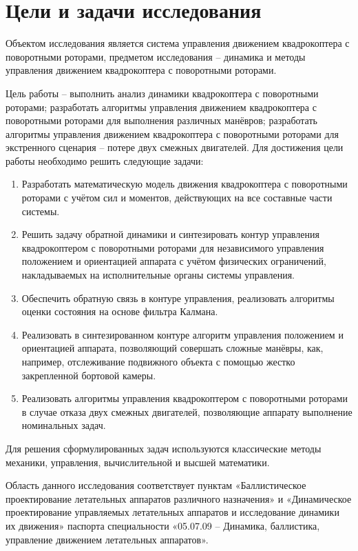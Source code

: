 \section{Цели и задачи исследования}

Объектом исследования является система управления движением квадрокоптера с поворотными роторами, предметом исследования -- динамика и методы управления движением квадрокоптера с поворотными роторами.

Цель работы -- выполнить анализ динамики квадрокоптера с поворотными роторами;
разработать алгоритмы управления движением квадрокоптера с поворотными роторами для выполнения различных манёвров; разработать алгоритмы управления движением квадрокоптера с поворотными роторами для экстренного сценария -- потере двух смежных двигателей. Для достижения цели работы необходимо решить следующие задачи:
\begin{enumerate}
	\item Разработать математическую модель движения квадрокоптера с поворотными роторами с учётом сил и моментов, действующих на все составные части системы.
	\item Решить задачу обратной динамики и синтезировать контур управления квадрокоптером с поворотными роторами для независимого управления положением и ориентацией аппарата с учётом физических ограничений, накладываемых на исполнительные органы системы управления.
	\item Обеспечить обратную связь в контуре управления, реализовать алгоритмы оценки состояния на основе фильтра Калмана.
	\item Реализовать в синтезированном контуре алгоритм управления положением и ориентацией аппарата, позволяющий совершать сложные манёвры, как, например, отслеживание подвижного объекта с помощью жестко закрепленной бортовой камеры.
	\item Реализовать алгоритмы управления квадрокоптером с поворотными роторами в случае отказа двух смежных двигателей, позволяющие аппарату выполнение номинальных задач.
\end{enumerate}
Для решения сформулированных задач используются классические методы механики, управления, вычислительной и высшей математики.

Область данного исследования соответствует пунктам «Баллистическое проектирование летательных аппаратов различного назначения» и «Динамическое проектирование управляемых летательных аппаратов и исследование динамики их движения» паспорта специальности «05.07.09 – Динамика, баллистика, управление движением летательных аппаратов».

